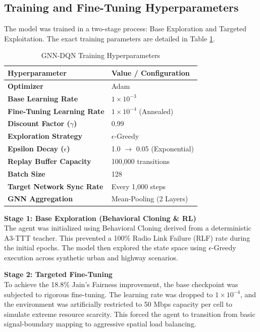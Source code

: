 \subsection{Training and Fine-Tuning Hyperparameters}
The model was trained in a two-stage process: Base Exploration and Targeted Exploitation. The exact training parameters are detailed in Table \ref{tab:hyperparams}.

\begin{table}[htbp]
\caption{GNN-DQN Training Hyperparameters}
\begin{center}
\begin{tabular}{|l|l|}
\hline
\textbf{Hyperparameter} & \textbf{Value / Configuration} \\
\hline
\textbf{Optimizer} & Adam \\
\textbf{Base Learning Rate} & $1 \times 10^{-3}$ \\
\textbf{Fine-Tuning Learning Rate} & $1 \times 10^{-4}$ (Annealed) \\
\textbf{Discount Factor ($\gamma$)} & 0.99 \\
\textbf{Exploration Strategy} & $\epsilon$-Greedy \\
\textbf{Epsilon Decay ($\epsilon$)} & 1.0 $\rightarrow$ 0.05 (Exponential) \\
\textbf{Replay Buffer Capacity} & 100,000 transitions \\
\textbf{Batch Size} & 128 \\
\textbf{Target Network Sync Rate} & Every 1,000 steps \\
\textbf{GNN Aggregation} & Mean-Pooling (2 Layers) \\
\hline
\end{tabular}
\label{tab:hyperparams}
\end{center}
\end{table}

\textbf{Stage 1: Base Exploration (Behavioral Cloning \& RL)} \\
The agent was initialized using Behavioral Cloning derived from a deterministic A3-TTT teacher. This prevented a 100\% Radio Link Failure (RLF) rate during the initial epochs. The model then explored the state space using $\epsilon$-Greedy execution across synthetic urban and highway scenarios.

\textbf{Stage 2: Targeted Fine-Tuning} \\
To achieve the 18.8\% Jain's Fairness improvement, the base checkpoint was subjected to rigorous fine-tuning. The learning rate was dropped to $1 \times 10^{-4}$, and the environment was artificially restricted to 50 Mbps capacity per cell to simulate extreme resource scarcity. This forced the agent to transition from basic signal-boundary mapping to aggressive spatial load balancing.
